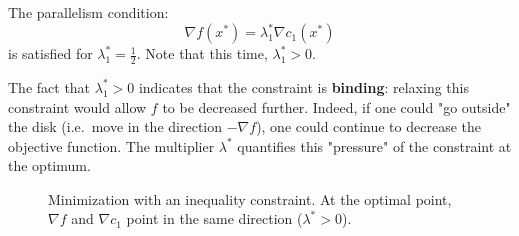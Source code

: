 The parallelism condition:
\begin{equation}
    \nabla f(x^*) = \lambda_1^* \nabla c_1(x^*)
\end{equation}
is satisfied for $\lambda_1^* = \frac{1}{2}$. Note that this time, $\lambda_1^* > 0$.

\begin{remarque}
The fact that $\lambda_1^* > 0$ indicates that the constraint is \textbf{binding}: relaxing this constraint would allow $f$ to be decreased further. Indeed, if one could "go outside" the disk (i.e.\ move in the direction $-\nabla f$), one could continue to decrease the objective function. The multiplier $\lambda^*$ quantifies this "pressure" of the constraint at the optimum.
\end{remarque}

\begin{figure}[H]
\centering
{}
\caption{Minimization with an inequality constraint. At the optimal point, $\nabla f$ and $\nabla c_1$ point in the same direction ($\lambda^* > 0$).}
\label{fig:ex-inequality-constraint}
\end{figure}

